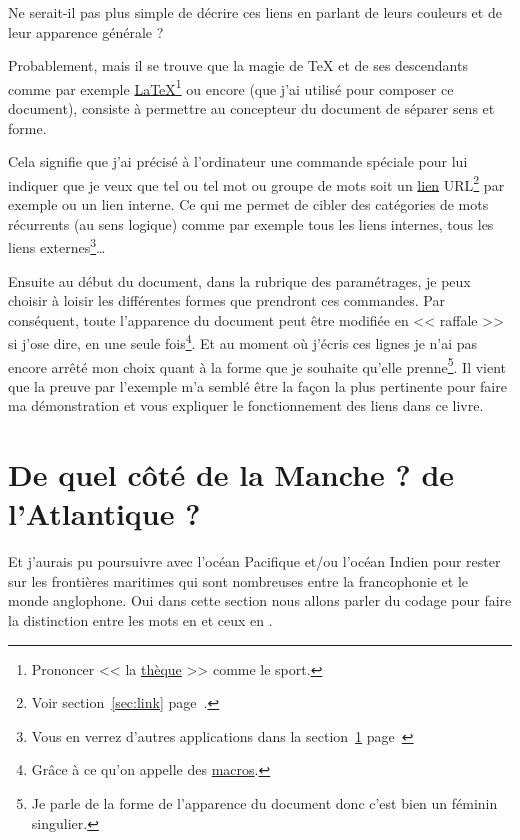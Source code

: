 Ne serait-il pas plus simple de décrire ces liens en parlant de leurs
couleurs et de leur apparence générale ?

Probablement, mais il se trouve que la magie de \TeX{} et de ses
descendants comme par exemple
\href{https://fr.wikipedia.org/wiki/LaTeX}{\LaTeX}\footnote{Prononcer
  << la
  \href{https://fr.wikipedia.org/wiki/Th\%C3\%A8que_(sport)}{thèque}
  >> comme le sport.} ou encore 
\href{https://en.wikipedia.org/wiki/XeTeX}{\XeLaTeX} (que j'ai utilisé
pour composer ce document), consiste à
permettre au concepteur du document de séparer sens et forme. 

Cela signifie que j'ai précisé à l'ordinateur une commande spéciale
pour lui indiquer que je veux que tel ou tel mot ou groupe de mots
soit un \hyperlink{url}{lien} URL\footnote{Voir section~\ref{sec:link}
  page~\pageref{sec:link}.} par exemple ou un lien interne. Ce qui me
permet de cibler des catégories de mots récurrents (au sens logique)
comme par exemple tous les liens internes, tous les liens
externes\footnote{Vous en verrez d'autres applications dans la
  section~\ref{sec:side} page~\pageref{sec:side}}\dots\xspace 

Ensuite au début du document, dans la rubrique des paramétrages, je
peux choisir à loisir les différentes formes que prendront ces
commandes. Par conséquent, toute l'apparence du document peut être
modifiée en << raffale >> si j'ose dire, en une seule
fois\footnote{Grâce à ce qu'on appelle des \href{http://www.tuteurs.ens.fr/logiciels/latex/macros.html}{macros}.}. Et au
moment où j'écris ces lignes je n'ai pas encore arrêté mon choix quant
à la forme que je souhaite qu'elle prenne\footnote{Je parle de la
  forme de l'apparence du document donc c'est bien un féminin
  singulier.}. Il vient que la preuve par l'exemple m'a semblé être la
façon la plus pertinente pour faire ma démonstration et vous expliquer le fonctionnement des liens dans ce livre.

\newpage

\section{De quel côté de la Manche ? de l'Atlantique ?}\label{sec:side}

Et j'aurais pu poursuivre avec l'océan Pacifique et/ou l'océan Indien
pour rester sur les frontières maritimes qui sont nombreuses entre la
francophonie et le monde anglophone. Oui dans cette section nous
allons parler du codage pour faire la distinction entre les mots en
 et ceux en .

